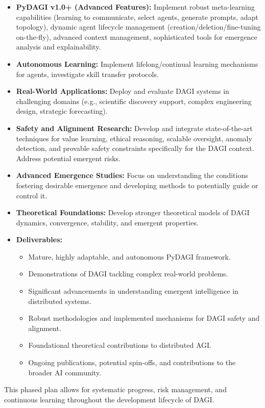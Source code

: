 \documentclass[12pt]{amsart}
\begin{document}
\begin{itemize}[leftmargin=*]
    \item \textbf{PyDAGI v1.0+ (Advanced Features):} Implement robust meta-learning capabilities (learning to communicate, select agents, generate prompts, adapt topology), dynamic agent lifecycle management (creation/deletion/fine-tuning on-the-fly), advanced context management, sophisticated tools for emergence analysis and explainability.
    \item \textbf{Autonomous Learning:} Implement lifelong/continual learning mechanisms for agents, investigate skill transfer protocols.
    \item \textbf{Real-World Applications:} Deploy and evaluate DAGI systems in challenging domains (e.g., scientific discovery support, complex engineering design, strategic forecasting).
    \item \textbf{Safety and Alignment Research:} Develop and integrate state-of-the-art techniques for value learning, ethical reasoning, scalable oversight, anomaly detection, and provable safety constraints specifically for the DAGI context. Address potential emergent risks.
    \item \textbf{Advanced Emergence Studies:} Focus on understanding the conditions fostering desirable emergence and developing methods to potentially guide or control it.
    \item \textbf{Theoretical Foundations:} Develop stronger theoretical models of DAGI dynamics, convergence, stability, and emergent properties.
    \item \textbf{Deliverables:}
        \begin{itemize}
            \item Mature, highly adaptable, and autonomous PyDAGI framework.
            \item Demonstrations of DAGI tackling complex real-world problems.
            \item Significant advancements in understanding emergent intelligence in distributed systems.
            \item Robust methodologies and implemented mechanisms for DAGI safety and alignment.
            \item Foundational theoretical contributions to distributed AGI.
            \item Ongoing publications, potential spin-offs, and contributions to the broader AI community.
        \end{itemize}
\end{itemize}
This phased plan allows for systematic progress, risk management, and continuous learning throughout the development lifecycle of DAGI.
\end{document}
